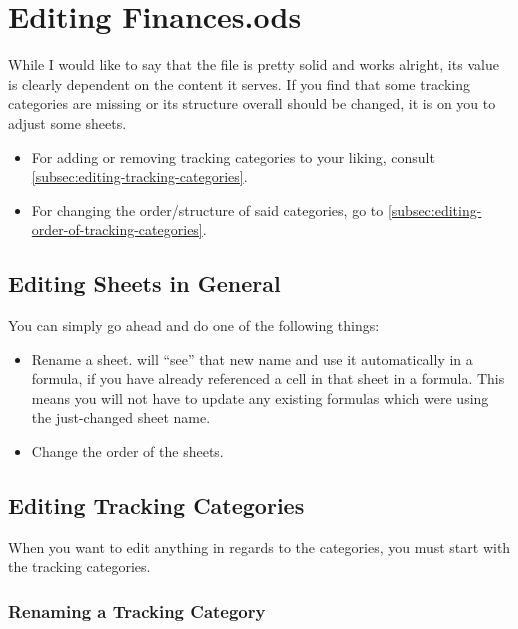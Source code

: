 \section{Editing Finances.ods}
\label{sec:editing-finances.ods}

While I would like to say that the file is pretty solid and works alright, its value is clearly dependent on the content it serves.
If you find that some tracking categories are missing or its structure overall should be changed, it is on you to adjust some sheets.
\begin{itemize}
	\item For adding or removing tracking categories to your liking, consult \autoref{subsec:editing-tracking-categories}.
	\item For changing the order/structure of said categories, go to \autoref{subsec:editing-order-of-tracking-categories}.
\end{itemize}

\subsection{Editing Sheets in General}
\label{subsec:editing-general-sheet-editing}

You can simply go ahead and do one of the following things:
\begin{itemize}
	\item Rename a sheet.
	\loc will ``see'' that new name and use it automatically in a formula, if you have already referenced a cell in that sheet in a formula.
	This means you will not have to update any existing formulas which were using the just-changed sheet name.
	\item Change the order of the sheets.
\end{itemize}

\subsection{Editing Tracking Categories}
\label{subsec:editing-tracking-categories}

When you want to edit anything in regards to the categories, you must start with the tracking categories.

\subsubsection{Renaming a Tracking Category}
\label{subsubsec:renaming-a-tracking-category}

